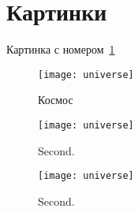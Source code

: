 \section{Картинки}

Картинка с номером~\ref{fig:uni}

\begin{figure}[H]
    \texttt{[image: universe]}
    \caption{Космос}\label{fig:uni}
\end{figure}

\begin{figure}[H]
    \centering
    \begin{minipage}{0.4\textwidth}
        \texttt{[image: universe]}
        \caption{Second.}\label{fig:figsA}
    \end{minipage}
    \quad
    \begin{minipage}{0.4\textwidth}
        \texttt{[image: universe]}
        \caption{Second.}\label{fig:figsB}
    \end{minipage}
\end{figure}

